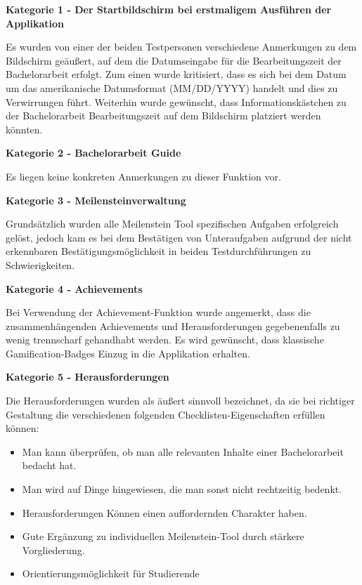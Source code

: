 \documentclass[bibliography=totoc,listof=totoc,BCOR=5mm,DIV=12,oneside]{scrbook}
\begin{document}
\par \bigskip \textbf{Kategorie 1 - Der Startbildschirm bei erstmaligem Ausführen der Applikation}
\par Es wurden von einer der beiden Testpersonen verschiedene Anmerkungen zu dem Bildschirm geäußert, auf dem die Datumseingabe für die Bearbeitungszeit der Bachelorarbeit erfolgt. Zum einen wurde kritisiert, dass es sich bei dem Datum um das amerikanische Datumsformat (MM/DD/YYYY) handelt und dies zu Verwirrungen führt. Weiterhin wurde gewünscht, dass Informationskästchen zu der Bachelorarbeit Bearbeitungszeit auf dem Bildschirm platziert werden könnten.

\par \bigskip \textbf{Kategorie 2 - Bachelorarbeit Guide}
\par Es liegen keine konkreten Anmerkungen zu dieser Funktion vor.

\par \bigskip \textbf{Kategorie 3 - Meilensteinverwaltung}
\par Grundsätzlich wurden alle Meilenstein Tool spezifischen Aufgaben erfolgreich gelöst, jedoch kam es bei dem Bestätigen von Unteraufgaben aufgrund der nicht erkennbaren Bestätigungsmöglichkeit in beiden Testdurchführungen zu Schwierigkeiten.

\par \bigskip \textbf{Kategorie 4 - Achievements}
\par Bei Verwendung der Achievement-Funktion wurde angemerkt, dass die zusammenhängenden Achievements und Herausforderungen gegebenenfalls zu wenig trennscharf gehandhabt werden. Es wird gewünscht, dass klassische Gamification-Badges Einzug in die Applikation erhalten.

\par \bigskip \textbf{Kategorie 5 - Herausforderungen}
\par Die Herausforderungen wurden als äußert sinnvoll bezeichnet, da sie bei richtiger Gestaltung die verschiedenen folgenden Checklisten-Eigenschaften erfüllen können:
\begin{itemize}
\item Man kann überprüfen, ob man alle relevanten Inhalte einer Bachelorarbeit bedacht hat.
\item Man wird auf Dinge hingewiesen, die man sonst nicht rechtzeitig bedenkt.
\item Herausforderungen Können einen auffordernden Charakter haben.
\item Gute Ergänzung zu individuellen Meilenstein-Tool durch stärkere Vorgliederung.
\item Orientierungsmöglichkeit für Studierende
\end{itemize}
\end{document}
